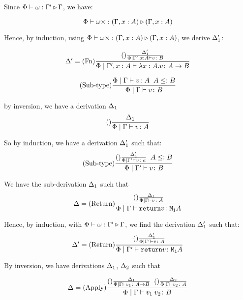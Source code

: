 {    Since $\Phi\vdash \omega : \Gamma' \triangleright \Gamma$, we have:

    \begin{equation}
        \Phi\vdash \omega\times : (\Gamma,x:  A) \triangleright (\Gamma, x: A)
    \end{equation}

    Hence, by induction, using $\Phi\vdash \omega\times : (\Gamma,x:  A) \triangleright (\Gamma, x: A)$, we derive $\Delta_1'$:

    \begin{equation}
        \Delta' = (\text{Fn}) \frac{
            (\text{}) \frac{\Delta_1'}{\Phi\mid\Gamma',x: A \vdash v \colon B}
        }{\Phi\mid\Gamma',x: A \vdash \lambda x : A. v \colon A\rightarrow B}
    \end{equation}


    \begin{equation}
        (\text{Sub-type}) \frac{\Phi\mid\Gamma \vdash v \colon A\;\; A\leq: B}{\Phi\mid\Gamma \vdash v \colon B}
    \end{equation}

    by inversion, we have a derivation $\Delta_1$
    \begin{equation}
        (\text{}) \frac{\Delta_1}{\Phi\mid\Gamma \vdash v \colon A}
    \end{equation}

    So by induction, we have a derivation $\Delta_1'$ such that:
    \begin{equation}
        (\text{Sub-type}) \frac{(\text{}) \frac{\Delta_1'}{\Phi\mid\Gamma' \vdash v \colon a}\;\; A \leq: B}{\Phi\mid\Gamma' \vdash v \colon B}
    \end{equation}

    We have the sub-derivation $\Delta_1$ such that
    \begin{equation}
        \Delta = (\text{Return}) \frac{(\text{}) \frac{\Delta_1}{\Phi\mid\Gamma \vdash v \colon A}}{\Phi\mid\Gamma \vdash \texttt{return} v \colon \texttt{M}_{\texttt{1}}{A}}
    \end{equation}

    Hence, by induction, with $\Phi\vdash \omega : \Gamma' \triangleright \Gamma$, we find the derivation $\Delta_1'$ such that:
    \begin{equation}
        \Delta' = (\text{Return}) \frac{(\text{}) \frac{\Delta_1'}{\Phi\mid\Gamma' \vdash v \colon A}}{\Phi\mid\Gamma' \vdash \texttt{return} v \colon \texttt{M}_{\texttt{1}}{A}}
    \end{equation}

        By inversion, we have derivations $\Delta_1$, $\Delta_2$ such that

        \begin{equation}
            \Delta = 
            (\text{Apply}) \frac{
                (\text{}) \frac{\Delta_1}{\Phi\mid\Gamma \vdash v_1 \colon A\rightarrow B}
                \;\;
                (\text{}) \frac{\Delta_2}{\Phi\mid\Gamma \vdash v_2 \colon A}
            }{
                \Phi\mid\Gamma \vdash v_1\; v_2 \colon B
            }
        \end{equation}

}
